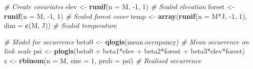 \documentclass[]{book}
\newenvironment{Shaded}{\begin{snugshade}}{\end{snugshade}}
\newcommand{\KeywordTok}[1]{\textcolor[rgb]{0.13,0.29,0.53}{\textbf{{#1}}}}
\newcommand{\DataTypeTok}[1]{\textcolor[rgb]{0.13,0.29,0.53}{{#1}}}
\newcommand{\DecValTok}[1]{\textcolor[rgb]{0.00,0.00,0.81}{{#1}}}
\newcommand{\StringTok}[1]{\textcolor[rgb]{0.31,0.60,0.02}{{#1}}}
\newcommand{\CommentTok}[1]{\textcolor[rgb]{0.56,0.35,0.01}{\textit{{#1}}}}
\newcommand{\NormalTok}[1]{{#1}}
\begin{document}
\begin{Shaded}
\begin{Highlighting}[]
\CommentTok{# Create covariates}
\NormalTok{elev <-}\StringTok{ }\KeywordTok{runif}\NormalTok{(}\DataTypeTok{n =} \NormalTok{M, -}\DecValTok{1}\NormalTok{, }\DecValTok{1}\NormalTok{)                         }\CommentTok{# Scaled elevation}
\NormalTok{forest <-}\StringTok{ }\KeywordTok{runif}\NormalTok{(}\DataTypeTok{n =} \NormalTok{M, -}\DecValTok{1}\NormalTok{, }\DecValTok{1}\NormalTok{)                       }\CommentTok{# Scaled forest cover}
\NormalTok{temp <-}\StringTok{ }\KeywordTok{array}\NormalTok{(}\KeywordTok{runif}\NormalTok{(}\DataTypeTok{n =} \NormalTok{M*J, -}\DecValTok{1}\NormalTok{, }\DecValTok{1}\NormalTok{), }\DataTypeTok{dim =} \KeywordTok{c}\NormalTok{(M, J)) }\CommentTok{# Scaled temperature}

\CommentTok{# Model for occurrence}
\NormalTok{beta0 <-}\StringTok{ }\KeywordTok{qlogis}\NormalTok{(mean.occupancy)               }\CommentTok{# Mean occurrence on link scale}
\NormalTok{psi <-}\StringTok{ }\KeywordTok{plogis}\NormalTok{(beta0 +}\StringTok{ }\NormalTok{beta1*elev +}\StringTok{ }\NormalTok{beta2*forest +}\StringTok{ }\NormalTok{beta3*elev*forest)}
\NormalTok{z <-}\StringTok{ }\KeywordTok{rbinom}\NormalTok{(}\DataTypeTok{n =} \NormalTok{M, }\DataTypeTok{size =} \DecValTok{1}\NormalTok{, }\DataTypeTok{prob =} \NormalTok{psi)      }\CommentTok{# Realised occurrence}


\end{Highlighting}
\end{Shaded}
\end{document}
